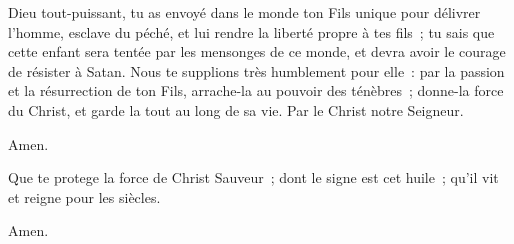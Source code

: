 
Dieu tout-puissant, tu as envoyé dans le monde ton Fils
unique pour délivrer l'homme, esclave du péché, et lui
rendre la liberté propre à tes fils~; tu sais que cette
enfant sera tentée par les mensonges de ce monde, et devra
avoir le courage de résister à Satan. Nous te supplions
très humblement pour elle~: par la passion et la résurrection
de ton Fils, arrache-la au pouvoir des ténèbres~; donne-la
force du Christ, et garde la tout au long de sa vie.
Par le Christ notre Seigneur.

 Amen.


Que te protege la force de Christ Sauveur~; dont le signe est cet huile~;
qu’il vit et reigne pour les siècles.

 Amen.

